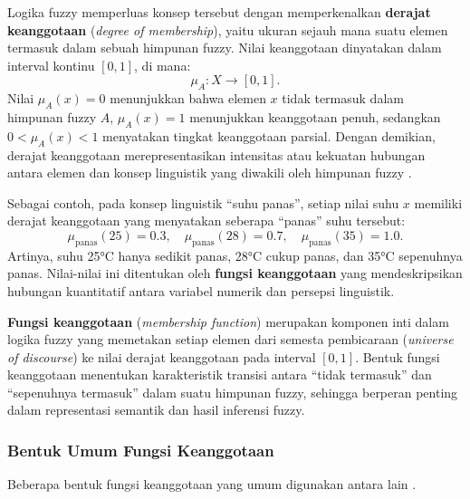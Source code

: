 \documentclass[12pt,a4paper]{article}
\theoremstyle{remark}
\begin{document}
Logika fuzzy memperluas konsep tersebut dengan memperkenalkan \textbf{derajat keanggotaan} (\textit{degree of membership}), yaitu ukuran sejauh mana suatu elemen termasuk dalam sebuah himpunan fuzzy. Nilai keanggotaan dinyatakan dalam interval kontinu \([0,1]\), di mana:
\[
    \mu_A: X \rightarrow [0,1].
\]
Nilai \(\mu_A(x)=0\) menunjukkan bahwa elemen \(x\) tidak termasuk dalam himpunan fuzzy \(A\), \(\mu_A(x)=1\) menunjukkan keanggotaan penuh, sedangkan \(0 < \mu_A(x) < 1\) menyatakan tingkat keanggotaan parsial. Dengan demikian, derajat keanggotaan merepresentasikan intensitas atau kekuatan hubungan antara elemen dan konsep linguistik yang diwakili oleh himpunan fuzzy \cite{ross_fuzzy_2016}.

Sebagai contoh, pada konsep linguistik “suhu panas”, setiap nilai suhu \(x\) memiliki derajat keanggotaan yang menyatakan seberapa “panas” suhu tersebut:
\[
    \mu_{\text{panas}}(25) = 0.3, \quad
    \mu_{\text{panas}}(28) = 0.7, \quad
    \mu_{\text{panas}}(35) = 1.0.
\]
Artinya, suhu 25°C hanya sedikit panas, 28°C cukup panas, dan 35°C sepenuhnya panas. Nilai-nilai ini ditentukan oleh \textbf{fungsi keanggotaan} yang mendeskripsikan hubungan kuantitatif antara variabel numerik dan persepsi linguistik.

\textbf{Fungsi keanggotaan} (\textit{membership function}) merupakan komponen inti dalam logika fuzzy yang memetakan setiap elemen dari semesta pembicaraan (\textit{universe of discourse}) ke nilai derajat keanggotaan pada interval \([0,1]\). Bentuk fungsi keanggotaan menentukan karakteristik transisi antara “tidak termasuk” dan “sepenuhnya termasuk” dalam suatu himpunan fuzzy, sehingga berperan penting dalam representasi semantik dan hasil inferensi fuzzy.

\subsubsection{Bentuk Umum Fungsi Keanggotaan}

Beberapa bentuk fungsi keanggotaan yang umum digunakan antara lain \cite{saputra_optimasi_2019}.
\end{document}
